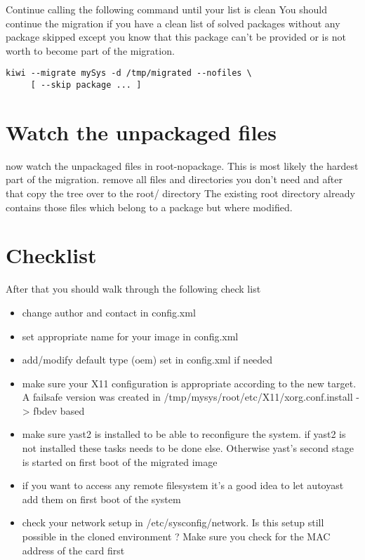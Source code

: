Continue calling the following command until your list is clean
You should continue the migration if you have a clean list of solved
packages without any package skipped except you know that this package
can't be provided or is not worth to become part of the migration.

\begin{Command}{14cm}
\begin{verbatim}
kiwi --migrate mySys -d /tmp/migrated --nofiles \
     [ --skip package ... ]
\end{verbatim}
\end{Command}

\section{Watch the unpackaged files}
now watch the unpackaged files in root-nopackage. This is most likely
the hardest part of the migration. remove all files and directories
you don't need and after that copy the tree over to the root/ directory
The existing root directory already contains those files which belong
to a package but where modified.

\section{Checklist}
After that you should walk through the following check list

\begin{itemize}
\item change author and contact in config.xml
\item set appropriate name for your image in config.xml
\item add/modify default type (oem) set in config.xml if needed
\item make sure your X11 configuration is appropriate according to
      the new target. A failsafe version was created in
      /tmp/mysys/root/etc/X11/xorg.conf.install -> fbdev based
\item make sure yast2 is installed to be able to reconfigure
      the system. if yast2 is not installed these tasks needs to
      be done else. Otherwise yast's second stage is started on first
      boot of the migrated image
\item if you want to access any remote filesystem it's a good
      idea to let autoyast add them on first boot of the system
\item check your network setup in /etc/sysconfig/network. Is this
      setup still possible in the cloned environment ? Make sure you
      check for the MAC address of the card first
\end{itemize}

